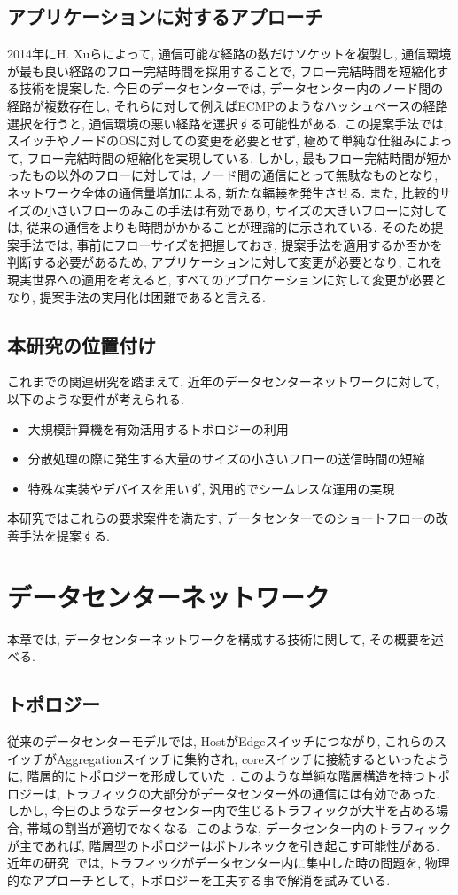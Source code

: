 \documentclass[11pt, a4paper, uplatex]{jsarticle}
\begin{document}
\subsection{アプリケーションに対するアプローチ}
2014年にH. Xuらによって, 通信可能な経路の数だけソケットを複製し, 通信環境が最も良い経路のフロー完結時間を採用することで,
フロー完結時間を短縮化する技術を提案した\cite{repflow}. 
今日のデータセンターでは, データセンター内のノード間の経路が複数存在し, それらに対して例えばECMPのようなハッシュベースの経路選択を行うと,
通信環境の悪い経路を選択する可能性がある. 
この提案手法では, スイッチやノードのOSに対しての変更を必要とせず, 極めて単純な仕組みによって, フロー完結時間の短縮化を実現している. 
しかし, 最もフロー完結時間が短かったもの以外のフローに対しては, ノード間の通信にとって無駄なものとなり, ネットワーク全体の通信量増加による,
新たな輻輳を発生させる. 
また, 比較的サイズの小さいフローのみこの手法は有効であり, サイズの大きいフローに対しては, 従来の通信をよりも時間がかかることが理論的に示されている. 
そのため提案手法では, 事前にフローサイズを把握しておき, 提案手法を適用するか否かを判断する必要があるため, アプリケーションに対して変更が必要となり,
これを現実世界への適用を考えると, すべてのアプロケーションに対して変更が必要となり, 提案手法の実用化は困難であると言える. 

\subsection{本研究の位置付け}
これまでの関連研究を踏まえて, 近年のデータセンターネットワークに対して, 以下のような要件が考えられる.
\begin{itemize}
  \item 大規模計算機を有効活用するトポロジーの利用
  \item 分散処理の際に発生する大量のサイズの小さいフローの送信時間の短縮
  \item 特殊な実装やデバイスを用いず, 汎用的でシームレスな運用の実現
\end{itemize}
本研究ではこれらの要求案件を満たす, データセンターでのショートフローの改善手法を提案する. 

\section{データセンターネットワーク}
本章では, データセンターネットワークを構成する技術に関して, その概要を述べる.

\subsection{トポロジー}
従来のデータセンターモデルでは, HostがEdgeスイッチにつながり,
これらのスイッチがAggregationスイッチに集約され,
coreスイッチに接続するといったように, 階層的にトポロジーを形成していた~\cite{fattree}.
このような単純な階層構造を持つトポロジーは, トラフィックの大部分がデータセンター外の通信には有効であった.
しかし, 今日のようなデータセンター内で生じるトラフィックが大半を占める場合, 帯域の割当が適切でなくなる.
このような, データセンター内のトラフィックが主であれば, 階層型のトポロジーはボトルネックを引き起こす可能性がある.
近年の研究~\cite{fattree,bcube,vl2}では, トラフィックがデータセンター内に集中した時の問題を, 物理的なアプローチとして,
トポロジーを工夫する事で解消を試みている.
\end{document}
